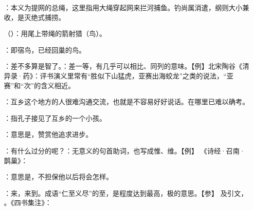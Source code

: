 {
\item {}：本义为提网的总绳，这里指用大绳穿起网来拦河捕鱼。钓尚属消遣，纲则大小兼收，是灭绝式捕捞。
\item {}（）：用尾上带绳的箭射猎（鸟）。
\item {}：即宿鸟，已经回巢的鸟。
}
{}



{
\item {}：差不多算是智了。：差一等，有几乎可以相比、同列的意味。【例】北宋陶谷《清异录·药》：评书演义里常有“胜似下山猛虎，亚赛出海蛟龙”之类的说法，“亚赛”和“次”的含义相近。
}
{}  %


{
\item {}：互乡这个地方的人很难沟通交流，也就是不容易好好说话。在哪里已难以确考。
\item {}：指孔子接见了互乡的一个小孩。
\item {}：意思是，赞赏他追求进步。
\item {}：有什么过分的呢？：无意义的句首助词，也写成惟、维。【例】 《诗经·召南·鹊巢》：
\item {}：意思是，不担保他以后将会怎样。
}
{}  %


{
\item {}：来，来到。成语“仁至义尽”的至，是程度达到最高，极的意思。【参】 及引文， 。《四书集注》：
}
{} %


